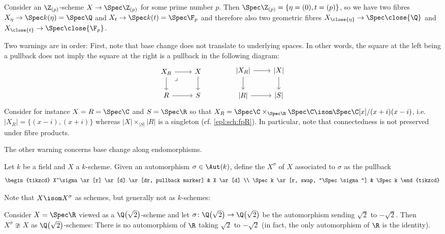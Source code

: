 \documentclass[wip, algebra]{bsteffan-lecturenotes}
\renewcommand{\P}{\mathbb{P}}
\newcommand{\nisom}{\ncong}
\begin{document}
\begin{example}
	Consider an $\Z_{(p)}$-scheme $X \to \Spec \Z_{(p)}$ for some prime number $p$.
	Then $\Spec \Z_{(p)} = \{\eta = (0), t = (p)\}$, so we have two fibres $X_\eta \to \Spec k(\eta) = \Spec \Q$ and $X_t \to \Spec k(t) = \Spec \F_p$ and therefore also two geometric fibres $X_{\close{\eta}} \to \Spec \close{\Q}$ and $X_{\close{t}} \to \Spec \close{\F_p}$.
\end{example}
Two warnings are in order: 
First, note that base change does not translate to underlying spaces.
In other words, the square at the left being a pullback does not imply the square at the right is a pullback in the following diagram:
\begin{equation*}
	\begin{tikzcd}
		X_R
				\ar[r]
				\ar[d]
				\ar[dr, phantom, "\lrcorner" very near start]
			& X
				\ar[d]
		\\
		R 
				\ar[r]
			& S
	\end{tikzcd}
	\qquad\qquad
	\begin{tikzcd}
		{|X_R|}
				\ar[r]
				\ar[d]
			& {|X|}
				\ar[d]
		\\
		{|R|}
				\ar[r]
			& {|S|}
	\end{tikzcd}
\end{equation*}
Consider for instance $X = R = \Spec \C$ and $S = \Spec \R$ so that $X_R = \Spec \C \times_{\Spec \R} \Spec \C \isom \Spec \C[x] / (x + i)(x - i)$, i.e. $|X_R| = \{(x - i), (x + i)\}$ whereas $|X| \times_{|S|} |R|$ is a singleton (cf. \cref{epl:sch:fpR}).
In particular, note that connectedness is not preserved under fibre products.

The other warning concerns base change along endomorphisms.
\begin{definition}
	Let $k$ be a field and $X$ a $k$-scheme.
	Given an automorphism $\sigma \in \Aut(k)$, define the  $X^\sigma$ of $X$ associated to $\sigma$ as the pullback
	\begin{equation*}
		\begin{tikzcd}
			X^\sigma
					\ar[r]
					\ar[d]
					\ar[dr, pullback marker]
				& X
					\ar[d]
			\\
			\Spec k
					\ar[r, swap, "\Spec \sigma"]
				& \Spec k
		\end{tikzcd}
	\end{equation*}
\end{definition}
Note that $X \isom X^\sigma$ as schemes, but generally not as $k$-schemes:
\begin{example}
	Consider $X = \Spec \R$ viewed as a $\Q\big(\sqrt{2}\big)$-scheme and let $\sigma\colon \Q\big(\sqrt{2}\big) \to \Q\big(\sqrt{2}\big)$ be the automorphism sending $\sqrt{2}$ to $-\sqrt{2}$.
	Then $X^\sigma \nisom X$ as $\Q\big(\sqrt{2}\big)$-schemes:
	There is no automorphism of $\R$ taking $\sqrt{2}$ to $-\sqrt{2}$ (in fact, the only automorphism of $\R$ is the identity).
\end{example}
\end{document}
